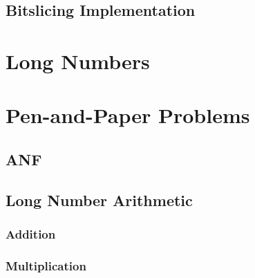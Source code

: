 \documentclass[11pt, a4paper]{article}
\begin{document}

\subsection{Bitslicing Implementation}\label{subsec:bitslicingImplementation}





\section{Long Numbers}\label{sec:longnumbers}

\section{Pen-and-Paper Problems}\label{sec:penandpaperproblems}

\subsection{ANF}\label{subsec:anf}

\subsection{Long Number Arithmetic}\label{subsec:longnumberarithmetic}

\subsubsection{Addition}\label{subsubsec:addition}

\subsubsection{Multiplication}\label{subsubsec:multiplication}
\end{document}
